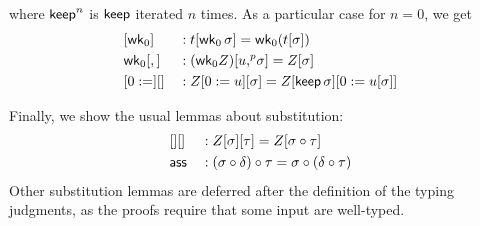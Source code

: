   where $\mathsf{keep}^n$ is $\mathsf{keep}$ iterated $n$ times. As a particular case
  for $n=0$, we get
\begin{alignat*}{5}
  & [\mathsf{wk}_0] && : t[\mathsf{wk}_0\,\sigma] = \mathsf{wk}_0 (t[\sigma]) \\
  & \mathsf{wk}_0[,] && : (\mathsf{wk}_0 Z)[u {,}^p \sigma] = Z[\sigma] \\
   & [0:=][] && : Z [ 0:= u][ \sigma] =  Z[\mathsf{keep}\,\sigma][0 := u[\sigma]]
  \end{alignat*}

Finally, we show the usual lemmas about substitution:
\begin{alignat*}{5}
  & [][] && : Z[\sigma][\tau] = Z[\sigma\circ\tau]
  \\
  & \mathsf{ass} && : (\sigma\circ \delta)\circ\tau = \sigma\circ (\delta\circ\tau)
  \end{alignat*}
  Other substitution lemmas are deferred after the definition of the typing
  judgments, as the proofs require that some input are well-typed.




